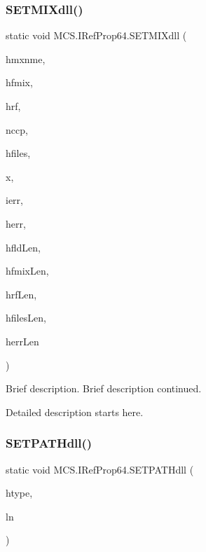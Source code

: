 \subsubsection{\texorpdfstring{S\+E\+T\+M\+I\+Xdll()}{SETMIXdll()}}
{\footnotesize\ttfamily static void M\+C\+S.\+I\+Ref\+Prop64.\+S\+E\+T\+M\+I\+Xdll (\begin{DoxyParamCaption}\item[{\mbox{[}\+Marshal\+As(\+Unmanaged\+Type.\+V\+B\+By\+Ref\+Str)\mbox{]} ref string}]{hmxnme,  }\item[{\mbox{[}\+Marshal\+As(\+Unmanaged\+Type.\+V\+B\+By\+Ref\+Str)\mbox{]} ref string}]{hfmix,  }\item[{\mbox{[}\+Marshal\+As(\+Unmanaged\+Type.\+V\+B\+By\+Ref\+Str)\mbox{]} ref string}]{hrf,  }\item[{ref long}]{nccp,  }\item[{\mbox{[}\+Marshal\+As(\+Unmanaged\+Type.\+V\+B\+By\+Ref\+Str)\mbox{]} ref string}]{hfiles,  }\item[{\mbox{[}\+Marshal\+As(\+Unmanaged\+Type.\+L\+P\+Array, Size\+Param\+Index=0)\mbox{]} double \mbox{[}$\,$\mbox{]}}]{x,  }\item[{ref long}]{ierr,  }\item[{\mbox{[}\+Marshal\+As(\+Unmanaged\+Type.\+V\+B\+By\+Ref\+Str)\mbox{]} ref string}]{herr,  }\item[{ref long}]{hfld\+Len,  }\item[{ref long}]{hfmix\+Len,  }\item[{ref long}]{hrf\+Len,  }\item[{ref long}]{hfiles\+Len,  }\item[{ref long}]{herr\+Len }\end{DoxyParamCaption})}



Brief description. Brief description continued. 

Detailed description starts here. \hypertarget{class_m_c_s_1_1_i_ref_prop64_aaa3dda6a52c6e8801344d53ff0b22045}{}\label{class_m_c_s_1_1_i_ref_prop64_aaa3dda6a52c6e8801344d53ff0b22045} 
\subsubsection{\texorpdfstring{S\+E\+T\+P\+A\+T\+Hdll()}{SETPATHdll()}}
{\footnotesize\ttfamily static void M\+C\+S.\+I\+Ref\+Prop64.\+S\+E\+T\+P\+A\+T\+Hdll (\begin{DoxyParamCaption}\item[{string}]{htype,  }\item[{ref long}]{ln }\end{DoxyParamCaption})}




